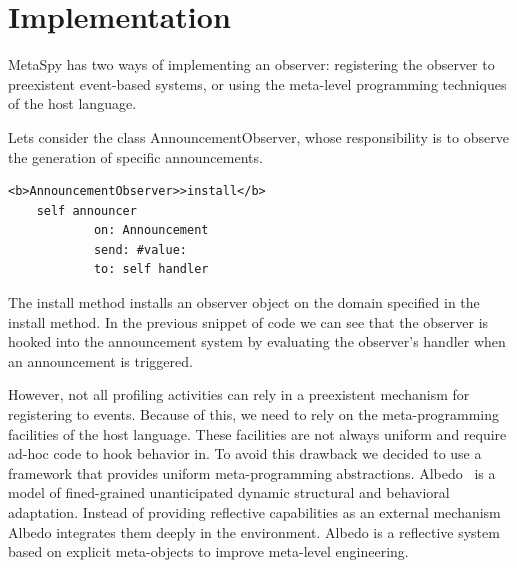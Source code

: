 \documentclass[runningheads]{llncs}
\newcommand{\project}{{\sc MetaSpy}\xspace}
\newcommand{\lr}[1]{\nb{Lukas}{orange}{#1}}
\newcommand{\jr}[1]{\nb{Jorge}{cyan}{#1}}
\newcommand{\seclabel}[1]{\label{sec:#1}}
\newcommand{\co}[1]{{\sf #1}}
\begin{document}
\section{Implementation}\seclabel{implementation}



\project has two ways of implementing an observer: registering the observer to preexistent event-based systems, or using the meta-level programming techniques of the host language.

Lets consider the class \co{AnnouncementObserver}, whose responsibility is to observe the generation of specific announcements.

\begin{lstlisting}
<b>AnnouncementObserver>>install</b>
	self announcer 
			on: Announcement 
			send: #value: 
			to: self handler
\end{lstlisting}

The \co{install} method installs an observer object on the domain specified in the \co{install} method. In the previous snippet of code we can see that the observer is hooked into the announcement system by evaluating the observer's handler when an announcement is triggered.

However, not all profiling activities can rely in a preexistent mechanism for registering to events. Because of this, we need to rely on the meta-programming facilities of the host language.
These facilities are not always uniform and require ad-hoc code to hook behavior in.
To avoid this drawback we decided to use a framework that provides uniform meta-programming abstractions.
Albedo~\cite{Ress10a} is a model of fined-grained unanticipated dynamic structural and behavioral adaptation. Instead of providing reflective capabilities as an external mechanism Albedo integrates them deeply in the environment. 
Albedo is a reflective system based on explicit meta-objects to improve meta-level engineering.
\end{document}
